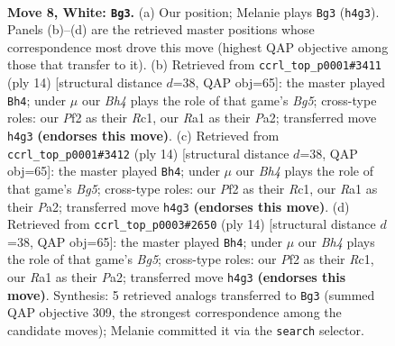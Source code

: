\documentclass[11pt]{article}
\begin{document}
\begin{figure}[p]\centering
\begin{subfigure}{0.46\textwidth}\centering
\resizebox{\linewidth}{!}{%
\newchessgame
\chessboard[
  setfen={rnbq1rk1/ppp1bp2/4pn1p/3p2p1/2PP3B/2N1PN2/PP3PPP/R2QKB1R w KQ - 0 8},
  showmover=false,
  pgfstyle=straightmove, color=movearrow, markmove={h4-g3}
]}
\caption{}
\end{subfigure}\hfill
\begin{subfigure}{0.46\textwidth}\centering
\resizebox{\linewidth}{!}{%
\newchessgame
\chessboard[
  setfen={rnbq1rk1/1pp1bpp1/p3pn1p/3p2B1/2PP4/2N1PN2/PP3PPP/2RQKB1R w K - 0 8},
  showmover=false,
  pgfstyle=straightmove, color=movearrow, markmove={g5-h4}
]}
\caption{}
\end{subfigure}
\\[4pt]
\begin{subfigure}{0.46\textwidth}\centering
\resizebox{\linewidth}{!}{%
\newchessgame
\chessboard[
  setfen={rnbq1rk1/1pp1bpp1/p3pn1p/3p2B1/2PP4/2N1PN2/PP3PPP/2RQKB1R w K - 0 8},
  showmover=false,
  pgfstyle=straightmove, color=movearrow, markmove={g5-h4}
]}
\caption{}
\end{subfigure}\hfill
\begin{subfigure}{0.46\textwidth}\centering
\resizebox{\linewidth}{!}{%
\newchessgame
\chessboard[
  setfen={rnbq1rk1/1pp1bpp1/p3pn1p/3p2B1/2PP4/2N1PN2/PP3PPP/2RQKB1R w K - 0 8},
  showmover=false,
  pgfstyle=straightmove, color=movearrow, markmove={g5-h4}
]}
\caption{}
\end{subfigure}
\caption{\textbf{Move 8, White: \texttt{Bg3}.} (a) Our position; Melanie plays \texttt{Bg3} (\texttt{h4g3}). Panels (b)--(d) are the retrieved master positions whose correspondence most drove this move (highest QAP objective among those that transfer to it). (b) Retrieved from \texttt{ccrl\_top\_p0001\#3411} (ply 14) [structural distance $d$=38, QAP obj=65]: the master played \texttt{Bh4}; under $\mu$ our \emph{Bh4} plays the role of that game's \emph{Bg5}; cross-type roles: our \emph{P}f2 as their \emph{R}c1, our \emph{R}a1 as their \emph{P}a2; transferred move \texttt{h4g3} \textbf{(endorses this move)}. (c) Retrieved from \texttt{ccrl\_top\_p0001\#3412} (ply 14) [structural distance $d$=38, QAP obj=65]: the master played \texttt{Bh4}; under $\mu$ our \emph{Bh4} plays the role of that game's \emph{Bg5}; cross-type roles: our \emph{P}f2 as their \emph{R}c1, our \emph{R}a1 as their \emph{P}a2; transferred move \texttt{h4g3} \textbf{(endorses this move)}. (d) Retrieved from \texttt{ccrl\_top\_p0003\#2650} (ply 14) [structural distance $d$=38, QAP obj=65]: the master played \texttt{Bh4}; under $\mu$ our \emph{Bh4} plays the role of that game's \emph{Bg5}; cross-type roles: our \emph{P}f2 as their \emph{R}c1, our \emph{R}a1 as their \emph{P}a2; transferred move \texttt{h4g3} \textbf{(endorses this move)}. Synthesis: 5 retrieved analogs transferred to \texttt{Bg3} (summed QAP objective 309, the strongest correspondence among the candidate moves); Melanie committed it via the \texttt{search} selector.}
\label{fig:thought-m14}
\end{figure}
\end{document}

